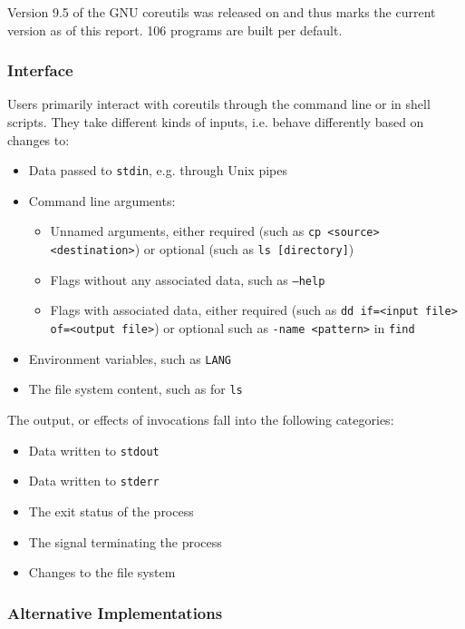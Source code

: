 \documentclass{article}
\newcommand{\code}[1]{\texttt{#1}}
\let\savedCite=\cite
\renewcommand{\cite}{\unskip~\savedCite}
\begin{document}
\begin{multicols}{2}
    Version 9.5 of the GNU coreutils was released on  and thus marks the current version as of this report. 106 programs are built per default.\cite{GNUCoreUtils9.5}

    \subsubsection{Interface}
    \label{CoreutilsInterface}

    Users primarily interact with coreutils through the command line or in shell scripts. They take different kinds of inputs, i.e. behave differently based on changes to:
    \begin{itemize}
        \item Data passed to \code{stdin}, e.g. through Unix pipes
        \item Command line arguments:
              \begin{itemize}
                  \item Unnamed arguments, either required (such as \code{cp <source> <destination>}) or optional (such as \code{ls [directory]})
                  \item Flags without any associated data, such as \code{--help}
                  \item Flags with associated data, either required (such as \code{dd if=<input file> of=<output file>}) or optional {such as \code{-name <pattern>} in \code{find}}
              \end{itemize}
        \item Environment variables, such as \code{LANG}
        \item The file system content, such as for \code{ls}
    \end{itemize}

    The output, or effects of invocations fall into the following categories:
    \begin{itemize}
        \item Data written to \code{stdout}
        \item Data written to \code{stderr}
        \item The exit status of the process
        \item The signal terminating the process
        \item Changes to the file system
    \end{itemize}

    \subsubsection{Alternative Implementations}


\end{multicols}
\end{document}
